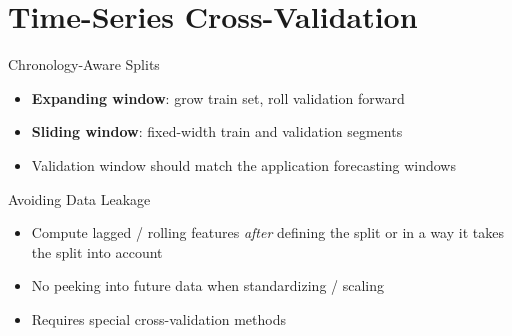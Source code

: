 \documentclass[11pt,compress,t,notes=noshow, xcolor=table]{beamer}
\begin{document}
\section{Time-Series Cross-Validation}
\begin{vbframe}{Chronology-Aware Splits}
  \begin{figure}[h]
    \centering
  \end{figure}
  \begin{itemize}
    \item \textbf{Expanding window}: grow train set, roll validation forward
    \item \textbf{Sliding window}: fixed-width train and validation segments
    \item Validation window should match the application forecasting windows
  \end{itemize}
\end{vbframe}

\begin{vbframe}{Avoiding Data Leakage}
\vfill
  \begin{itemize}
    \item Compute lagged / rolling features \emph{after} defining the split or in a way it takes the split into account
    \item No peeking into future data when standardizing / scaling
    \item Requires special cross-validation methods
  \end{itemize}
\vfill
\end{vbframe}
\end{document}
